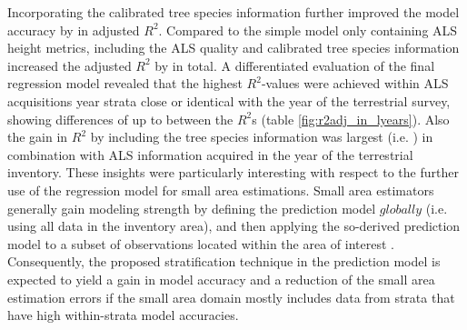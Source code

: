 Incorporating the calibrated tree species information further improved the model accuracy by  in adjusted $R^2$. Compared to the simple model only containing ALS height metrics, including the ALS quality and calibrated tree species information increased the adjusted $R^2$ by  in total. A differentiated evaluation of the final regression model revealed that the highest $R^2$-values were achieved within ALS acquisitions year strata close or identical with the year of the terrestrial survey, showing differences of up to  between the $R^2$s (table \ref{fig:r2adj_in_lyears}). Also the gain in $R^2$ by including the tree species information was largest (i.e. ) in combination with ALS information acquired in the year of the terrestrial inventory. These insights were particularly interesting with respect to the further use of the regression model for small area estimations. Small area estimators generally gain modeling strength by defining the prediction model $globally$ (i.e. using all data in the inventory area), and then applying the so-derived prediction model to a subset of observations located within the area of interest \citep{mandallaz2016}. Consequently, the proposed stratification technique in the prediction model is expected to yield a gain in model accuracy and a reduction of the small area estimation errors if the small area domain mostly includes data from strata that have high within-strata model accuracies. \par



